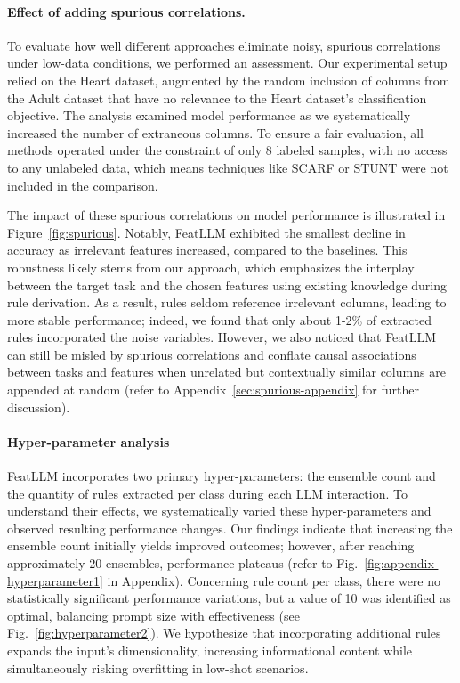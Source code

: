 \vspace*{-0.12in}
\paragraph{Effect of adding spurious correlations.} To evaluate how well different approaches eliminate noisy, spurious correlations under low-data conditions, we performed an assessment. Our experimental setup relied on the Heart dataset, augmented by the random inclusion of columns from the Adult dataset that have no relevance to the Heart dataset's classification objective. The analysis examined model performance as we systematically increased the number of extraneous columns. To ensure a fair evaluation, all methods operated under the constraint of only 8 labeled samples, with no access to any unlabeled data, which means techniques like SCARF or STUNT were not included in the comparison.

The impact of these spurious correlations on model performance is illustrated in Figure~\ref{fig:spurious}. Notably, \textsf{FeatLLM} exhibited the smallest decline in accuracy as irrelevant features increased, compared to the baselines. This robustness likely stems from our approach, which emphasizes the interplay between the target task and the chosen features using existing knowledge during rule derivation. As a result, rules seldom reference irrelevant columns, leading to more stable performance; indeed, we found that only about 1-2\% of extracted rules incorporated the noise variables. However, we also noticed that \textsf{FeatLLM} can still be misled by spurious correlations and conflate causal associations between tasks and features when unrelated but contextually similar columns are appended at random (refer to Appendix~\ref{sec:spurious-appendix} for further discussion).

\vspace*{-0.12in}
\paragraph{Hyper-parameter analysis}
\textsf{FeatLLM} incorporates two primary hyper-parameters: the ensemble count and the quantity of rules extracted per class during each LLM interaction. To understand their effects, we systematically varied these hyper-parameters and observed resulting performance changes. Our findings indicate that increasing the ensemble count initially yields improved outcomes; however, after reaching approximately 20 ensembles, performance plateaus (refer to Fig.~\ref{fig:appendix-hyperparameter1} in Appendix). Concerning rule count per class, there were no statistically significant performance variations, but a value of 10 was identified as optimal, balancing prompt size with effectiveness (see Fig.~\ref{fig:hyperparameter2}). We hypothesize that incorporating additional rules expands the input’s dimensionality, increasing informational content while simultaneously risking overfitting in low-shot scenarios.

